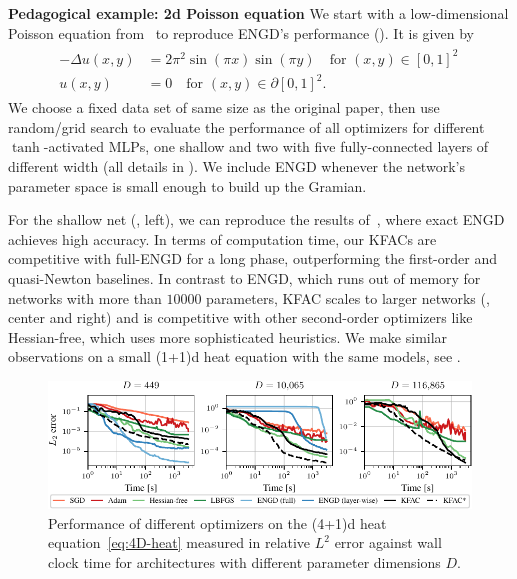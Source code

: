 \textbf{Pedagogical example: 2d Poisson equation}
We start with a low-dimensional Poisson equation from~\citet{muller2023achieving} to reproduce ENGD's performance ().
It is given by
\begin{align}\label{eq:2D-Poisson}
  \begin{split}
    -\Delta u(x,y)
    &=
      2\pi^2 \sin(\pi x) \sin(\pi y) \quad \text{for } (x,y)\in[0,1]^2\,
    \\
    u(x,y)
    &=
      0 \quad \text{for } (x,y) \in\partial[0,1]^2.
  \end{split}
\end{align}
We choose a fixed data set of same size as the original paper, then use random/grid search to evaluate the performance of all optimizers for different $\tanh$-activated MLPs, one shallow and two with five fully-connected layers of different width (all details in ).
We include ENGD whenever the network's parameter space is small enough to build up the Gramian.

For the shallow net (, left), we can reproduce the results of~\cite{muller2023achieving}, where exact ENGD achieves high accuracy.
In terms of computation time, our KFACs are competitive with full-ENGD for a long phase, outperforming the first-order and quasi-Newton baselines.
In contrast to ENGD, which runs out of memory for networks with more than $\num{10000}$ parameters, KFAC scales to larger networks (, center and right) and is competitive with other second-order optimizers like Hessian-free, which uses more sophisticated heuristics.
We make similar observations on a small (1+1)d heat equation with the same models, see .

\begin{figure}
  \centering
  \includegraphics{../kfac_pinns_exp/exp30_heat4d_groupplot/l2_error_over_time.pdf}
  \caption{Performance of different optimizers on the (4+1)d heat equation~\eqref{eq:4D-heat} measured in relative $L^2$ error against wall clock time for architectures with different parameter dimensions $D$.}
  \label{fig:4D-heat}
\end{figure}

